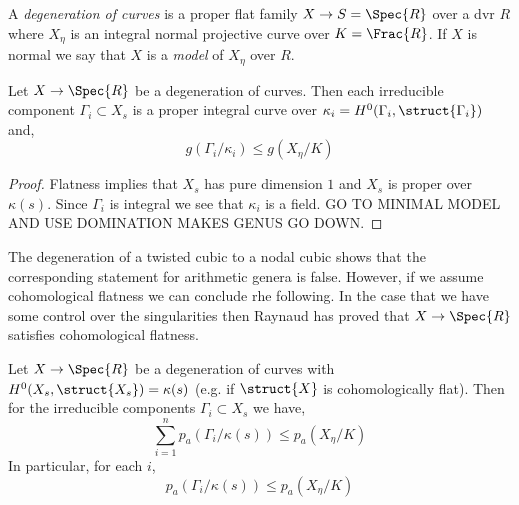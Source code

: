 \documentclass[12pt]{article}
\begin{document}
\begin{defn}
A \textit{degeneration of curves} is a proper flat family $X \to S = \Spec{R}$ over a dvr $R$ where $X_{\eta}$ is an integral normal projective curve over $K = \Frac{R}$. If $X$ is normal we say that $X$ is a \textit{model} of $X_{\eta}$ over $R$.
\end{defn}

\begin{prop}
Let $X \to \Spec{R}$ be a degeneration of curves. Then each irreducible component $\Gamma_i \subset X_s$ is a proper integral curve over $\kappa_i = H^0(\Gamma_i, \struct{\Gamma_i})$ and,
\[ g(\Gamma_i/\kappa_i) \le g(X_{\eta}/K) \]
\end{prop}

\begin{proof}
Flatness implies that $X_s$ has pure dimension $1$ and $X_s$ is proper over $\kappa(s)$. Since $\Gamma_i$ is integral we see that $\kappa_i$ is a field. GO TO MINIMAL MODEL AND USE DOMINATION MAKES GENUS GO DOWN.
\end{proof}

\begin{rmk}
The degeneration of a twisted cubic to a nodal cubic shows that the corresponding statement for arithmetic genera is false. However, if we assume cohomological flatness we can conclude rhe following. In the case that we have some control over the singularities then Raynaud has proved that $X \to \Spec{R}$ satisfies cohomological flatness.
\end{rmk}

\begin{prop}
Let $X \to \Spec{R}$ be a degeneration of curves with $H^0(X_s, \struct{X_s}) = \kappa(s)$ (e.g. if $\struct{X}$ is cohomologically flat). Then for the irreducible components $\Gamma_i \subset X_s$ we have,
\[ \sum_{i = 1}^n p_a(\Gamma_i / \kappa(s)) \le p_a(X_\eta / K) \]
In particular, for each $i$,
\[ p_a(\Gamma_i / \kappa(s)) \le p_a(X_\eta / K) \]
\end{prop}
\end{document}
